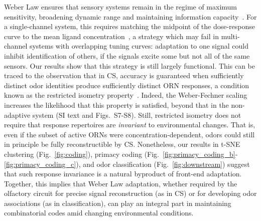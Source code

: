 \documentclass[9pt,twocolumn,twoside]{pnas-new}
\begin{document}
Weber Law ensures that sensory systems remain in the regime of maximum sensitivity, broadening dynamic range and maintaining information capacity~\cite{adaptation_fairhall}.
For a single-channel system, this requires matching the midpoint of the dose-response curve to the mean ligand concentration~\cite{information_theory_adaptation}, a strategy which may fail in multi-channel systems with overlapping tuning curves: adaptation to one signal could inhibit identification of others, if the signals excite some but not all of the same sensors. 
Our results show that this strategy is still largely functional. This can be traced to the observation that in CS, accuracy is guaranteed when sufficiently distinct odor identities produce sufficiently distinct ORN responses, a condition known as the restricted isometry property~\cite{CS_tao}. Indeed, the Weber-Fechner scaling increases the likelihood that this property  is satisfied, beyond that in the non-adaptive system (SI text and Figs.~S7-S8). Still, restricted isometry does not require that response repertoires are \textit{invariant} to environmental changes. That is, even if the subset of active ORNs were concentration-dependent, odors could still in principle be fully reconstructible by CS.
Nonetheless, our results in t-SNE clustering (Fig.~\ref{fig:coding}), primacy coding  (Fig.~\ref{fig:primacy_coding_b}-\ref{fig:primacy_coding_c}), and odor classification (Fig.~\ref{fig:downstream}) suggest that such response invariance is a natural byproduct of front-end adaptation. Together, this implies that Weber Law adaptation, whether required by the olfactory circuit for precise signal reconstruction (as in CS) or for developing odor associations (as in classification), can play an integral part in maintaining combinatorial codes amid changing environmental conditions.


\end{document}
